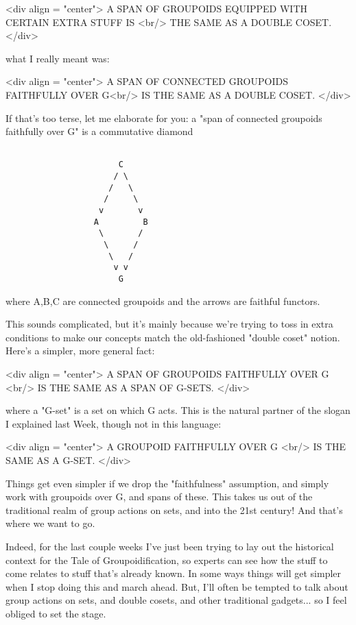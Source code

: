 <div align = "center">
          A SPAN OF GROUPOIDS EQUIPPED WITH CERTAIN EXTRA STUFF IS  <br/>
                      THE SAME AS A DOUBLE COSET.
</div>

what I really meant was:

<div align = "center">
               A SPAN OF CONNECTED GROUPOIDS FAITHFULLY OVER G<br/>
                      IS THE SAME AS A DOUBLE COSET.                      
</div>

If that's too terse, let me elaborate for you: a "span of connected 
groupoids faithfully over G" is a commutative diamond


\begin{verbatim}

                       C
                      / \
                     /   \
                    /     \
                   v       v
                  A         B
                   \       /
                    \     /
                     \   /
                      v v
                       G
\end{verbatim}
    
where A,B,C are connected groupoids and the arrows are faithful
functors.

This sounds complicated, but it's mainly because we're trying to toss
in extra conditions to make our concepts match the old-fashioned "double
coset" notion.  Here's a simpler, more general fact: 

<div align = "center">
                A SPAN OF GROUPOIDS FAITHFULLY OVER G <br/>
                  IS THE SAME AS A SPAN OF G-SETS.
</div>

where a "G-set" is a set on which G acts.  This is the natural partner 
of the slogan I explained last Week, though not in this language:

<div align = "center">
                   A GROUPOID FAITHFULLY OVER G <br/>
                     IS THE SAME AS A G-SET.
</div>

Things get even simpler if we drop the "faithfulness" assumption, and
simply work with groupoids over G, and spans of these.   This takes
us out of the traditional realm of group actions on sets, and into the
21st century!  And that's where we want to go.   

Indeed, for the last couple weeks I've just been trying to lay out the
historical context for the Tale of Groupoidification, so experts can
see how the stuff to come relates to stuff that's already known.  In
some ways things will get simpler when I stop doing this and march
ahead.  But, I'll often be tempted to talk about group actions on
sets, and double cosets, and other traditional gadgets... so I feel
obliged to set the stage.
       
